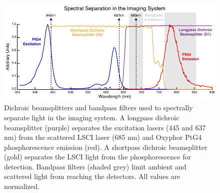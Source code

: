 \begin{figure}
    \includegraphics{figures/chapter_2/systemspectra.pdf}
    \caption {
        \label{fig:systemspectra}
        Dichroic beamsplitters and bandpass filters used to spectrally separate light in the imaging system. A longpass dichroic beamsplitter (purple) separates the excitation lasers (445 and 637 nm) from the scattered LSCI laser (685 nm) and Oxyphor PtG4 phosphorescence emission (red). A shortpass dichroic beamsplitter (gold) separates the LSCI light from the phosphorescence for detection. Bandpass filters (shaded grey) limit ambient and scattered light from reaching the detectors. All values are normalized.
    }
\end{figure}

\begin{table}
    \caption{Summary of optical filters.}
    \label{tab:filters}
    \centering
\end{table}

